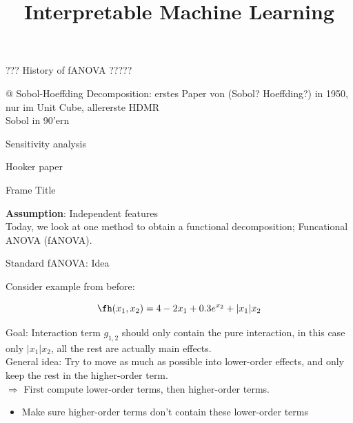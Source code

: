 \documentclass[11pt,compress,t,notes=noshow, aspectratio=169, xcolor=table]{beamer}
\title{Interpretable Machine Learning}
\date{}
\begin{document}
\newcommand{\titlefigure}{figure/open_blackbox}
\newcommand{\learninggoals}{
\item Understand one classical kind of functional decomposition: functional ANOVA (fANOVA).
\item [...]
\item Algorithm for calculating the components in a fANOVA}


\begin{frame}{??? History of fANOVA ?????}

@ Sobol-Hoeffding Decomposition: erstes Paper von (Sobol? Hoeffding?) in 1950, nur im Unit Cube, allererste HDMR \\

Sobol in 90'ern

Sensitivity analysis

Hooker paper


    
\end{frame}

\begin{frame}{Frame Title}

    \textbf{Assumption}: Independent features \\
    Today, we look at one method to obtain a functional decomposition; Funcational ANOVA (fANOVA).
    
\end{frame}

\begin{frame}{Standard fANOVA: Idea}

    Consider example from before:

    \begin{equation}
        \fh(x_1, x_2) = 4 - 2x_1 + 0.3 e^{x_2} + |x_1|x_2
    \end{equation}

    Goal: Interaction term \(g_{1,2}\) should only contain the pure interaction, in this case only \(|x_1|x_2\), all the rest are actually main effects. \\
    General idea: Try to move as much as possible into lower-order effects, and only keep the rest in the higher-order term. \\
    \(\Rightarrow\) First compute lower-order terms, then higher-order terms.
    \begin{itemize}
        \item Make sure higher-order terms don't contain these lower-order terms
    \end{itemize}
    
\end{frame}
\end{document}
